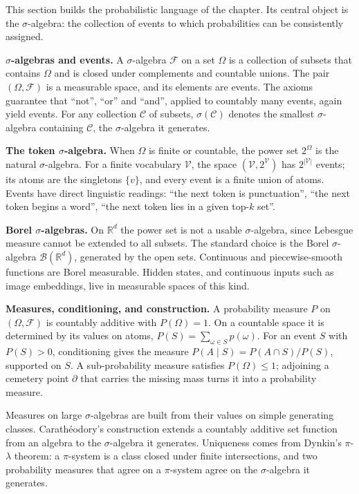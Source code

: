 This section builds the probabilistic language of the chapter. Its
central object is the \(\sigma\)-algebra: the collection of events to which
probabilities can be consistently assigned.

\textbf{\(\sigma\)-algebras and events.} A \(\sigma\)-algebra \(\mathcal{F}\) on a set \(\Omega\) is a collection
of subsets that contains \(\Omega\) and is closed under complements and countable
unions. The pair \((\Omega, \mathcal{F})\) is a measurable space, and its elements are
events. The axioms guarantee that ``not'', ``or'' and ``and'', applied
to countably many events, again yield events. For any collection \(\mathcal{C}\) of
subsets, \(\sigma(\mathcal{C})\) denotes the smallest \(\sigma\)-algebra containing \(\mathcal{C}\), the \(\sigma\)-algebra
it generates.

\textbf{The token \(\sigma\)-algebra.} When \(\Omega\) is finite or countable, the power
set \(2^{\Omega}\) is the natural \(\sigma\)-algebra. For a finite vocabulary \(\mathcal{V}\), the
space \((\mathcal{V}, 2^{\mathcal{V}})\) has \(2^{|\mathcal{V}|}\) events; its atoms are
the singletons \(\{v\}\), and every event is a finite union of atoms. Events
have direct linguistic readings: ``the next token is punctuation'',
``the next token begins a word'', ``the next token lies in a given top-\(k\)
set''.

\textbf{Borel \(\sigma\)-algebras.} On \(\mathbb{R}^{d}\) the power set is not a
usable \(\sigma\)-algebra, since Lebesgue measure cannot be extended to all
subsets. The standard choice is the Borel \(\sigma\)-algebra
\(\mathcal{B}(\mathbb{R}^{d})\), generated by the open sets. Continuous and
piecewise-smooth functions are Borel measurable. Hidden states, and
continuous inputs such as image embeddings, live in measurable spaces of
this kind.

\textbf{Measures, conditioning, and construction.} A probability measure
\(P\) on \((\Omega, \mathcal{F})\) is countably additive with \(P(\Omega) = 1\). On a countable space it
is determined by its values on atoms, \(P(S) = \sum_{\omega \in S} p(\omega)\). For
an event \(S\) with \(P(S) > 0\), conditioning gives the measure
\(P(A \mid S) = P(A \cap S)/P(S)\), supported on \(S\). A sub-probability
measure satisfies \(P(\Omega) \le 1\); adjoining a cemetery point \(\partial\) that carries
the missing mass turns it into a probability measure.

Measures on large \(\sigma\)-algebras are built from their values on simple
generating classes. Carathéodory's construction extends a countably
additive set function from an algebra to the \(\sigma\)-algebra it generates.
Uniqueness comes from Dynkin's \(\pi\)-\(\lambda\) theorem: a \(\pi\)-system is a class closed
under finite intersections, and two probability measures that agree on a
\(\pi\)-system agree on the \(\sigma\)-algebra it generates.

